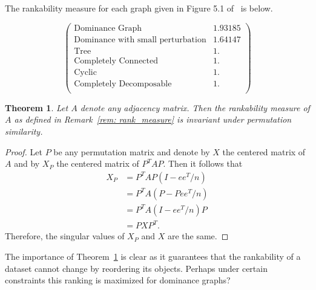 \documentclass{article}
\newtheorem{theorem}{Theorem}[section]
\begin{document}
The rankability measure for each graph given in Figure 5.1 of~\cite{Anderson} is below.

\[
\left(
\begin{array}{cc}
 \text{Dominance Graph} & 1.93185 \\
 \text{Dominance with small perturbation} & 1.64147 \\
 \text{Tree} & 1. \\
 \text{Completely Connected} & 1. \\
 \text{Cyclic} & 1. \\
 \text{Completely Decomposable} & 1. \\
\end{array}
\right)
\]

\begin{theorem}\label{thm: perm_inv}
Let $A$ denote any adjacency matrix. 
Then the rankability measure of $A$ as defined in Remark~\ref{rem: rank_measure} is invariant under permutation similarity. 
\end{theorem}
\begin{proof}
Let $P$ be any permutation matrix and denote by $X$ the centered matrix of $A$ and by $X_{P}$ the centered matrix of $P^{T}AP$. 
Then it follows that
\begin{align*}
X_{P} &= P^{T}AP\left(I-ee^{T}/n\right) \\
&= P^{T}A\left(P-Pee^{T}/n\right) \\
&= P^{T}A\left(I-ee^{T}/n\right)P \\
&= PXP^{T}. 
\end{align*}
Therefore, the singular values of $X_{P}$ and $X$ are the same. 
\end{proof}

The importance of Theorem~\ref{thm: perm_inv} is clear as it guarantees that the rankability of a dataset cannot change by reordering its objects. 
Perhaps under certain constraints this ranking is maximized for dominance graphs?

\label{Bibliography}


\end{document}
